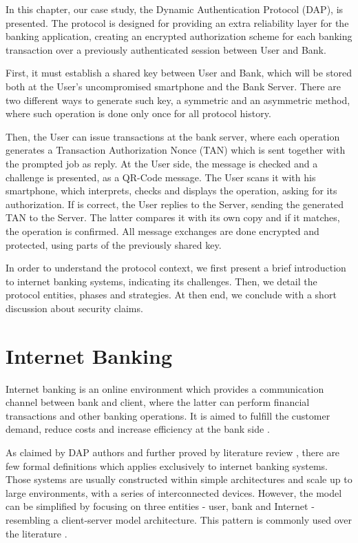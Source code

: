 \label{chap:dap}

In this chapter, our case study, the Dynamic Authentication Protocol (DAP), is presented. The protocol is designed for providing an extra reliability layer for the banking application, creating an encrypted authorization scheme for each banking transaction over a previously authenticated session between User and Bank.

First, it must establish a shared key between User and Bank, which will be stored both at the User's uncompromised smartphone and the Bank Server. There are two different ways to generate such key, a symmetric and an asymmetric method, where such operation is done only once for all protocol history.

Then, the User can issue transactions at the bank server, where each operation generates a Transaction Authorization Nonce (TAN) which is sent together with the prompted job as reply. At the User side, the message is checked and a challenge is presented, as a QR-Code message. The User scans it with his smartphone, which interprets, checks and displays the operation, asking for its authorization. If is correct, the User replies to the Server, sending the generated TAN to the Server. The latter compares it with its own copy and if it matches, the operation is confirmed. All message exchanges are done encrypted and protected, using parts of the previously shared key.

In order to understand the protocol context, we first present a brief introduction to internet banking systems, indicating its challenges. Then, we detail the protocol entities, phases and strategies. At then end, we conclude with a short discussion about security claims.










\section{Internet Banking}
Internet banking is an online environment which provides a communication channel between bank and client, where the latter can perform financial transactions and other banking operations. It is aimed to fulfill the customer demand, reduce costs and increase efficiency at the bank side \cite{Hutchinson2003}.

As claimed by DAP authors \cite[p.8]{Peotta2012} and further proved by literature review \cite{Hutchinson2003}, there are few formal definitions which applies exclusively to internet banking systems. Those systems are usually constructed within simple architectures and scale up to large environments, with a series of interconnected devices. However, the model can be simplified by focusing on three entities - user, bank and Internet - resembling a client-server model architecture. This pattern is commonly used over the literature \cite{Hutchinson2003}.

